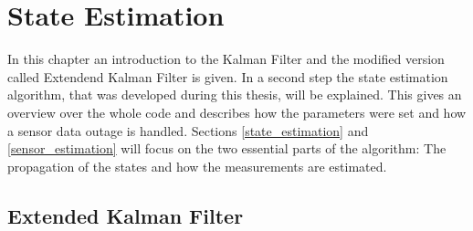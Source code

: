 \chapter{State Estimation}\label{cha3}
In this chapter an introduction to the Kalman Filter and the modified version called Extendend Kalman Filter is given. In a second step  the state estimation algorithm, that was developed during this thesis, will be explained. This gives an overview over the whole code and describes how the parameters were set and how a sensor data outage is handled. Sections \ref{state_estimation} and \ref{sensor_estimation} will focus on the two essential parts of the algorithm: The propagation of the states and how the measurements are estimated.


\section{Extended Kalman Filter}

